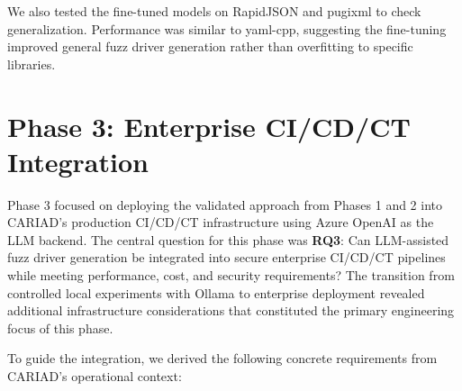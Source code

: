 We also tested the fine-tuned models on RapidJSON and pugixml to check generalization. Performance was similar to yaml-cpp, suggesting the fine-tuning improved general fuzz driver generation rather than overfitting to specific libraries.

\section{Phase 3: Enterprise CI/CD/CT Integration}
\label{sec:impl_phase3}

Phase 3 focused on deploying the validated approach from Phases 1 and 2 into CARIAD's production CI/CD/CT infrastructure using Azure OpenAI \cite{azure_openai} as the LLM backend. The central question for this phase was \textbf{RQ3}: Can LLM-assisted fuzz driver generation be integrated into secure enterprise CI/CD/CT pipelines while meeting performance, cost, and security requirements? The transition from controlled local experiments with Ollama \cite{ollama} to enterprise deployment revealed additional infrastructure considerations that constituted the primary engineering focus of this phase.

To guide the integration, we derived the following concrete requirements from CARIAD's operational context:

